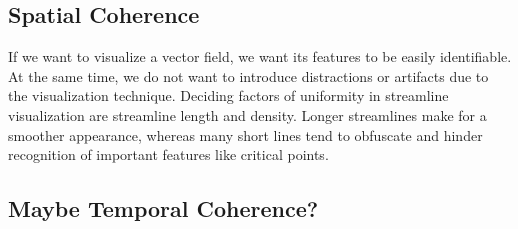 \subsection{Spatial Coherence}
If we want to visualize a vector field, we want its features to be easily identifiable.
At the same time, we do not want to introduce distractions or artifacts due to the visualization technique.
Deciding factors of uniformity in streamline visualization are streamline length and density.
Longer streamlines make for a smoother appearance, whereas many short lines tend to obfuscate and hinder recognition of important features like critical points.
\subsection{Maybe Temporal Coherence?}